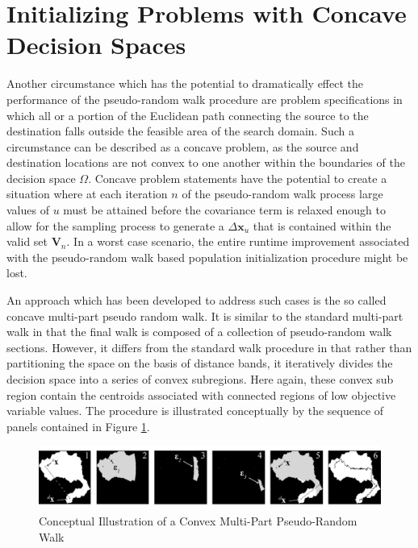 \section{Initializing Problems with Concave Decision Spaces}
            
Another circumstance which has the potential to dramatically effect the performance of the pseudo-random walk procedure are problem specifications in which all or a portion of the Euclidean path connecting the source to the destination falls outside the feasible area of the search domain. Such a circumstance can be described as a concave problem, as the source and destination locations are not convex to one another within the boundaries of the decision space $\Omega$. Concave problem statements have the potential to create a situation where at each iteration $n$ of the pseudo-random walk process large values of $u$ must be attained before the covariance term is relaxed enough to allow for the sampling process to generate a $\Delta\textbf{x}_u$ that is contained within the valid set $\textbf{V}_n$. In a worst case scenario, the entire runtime improvement associated with the pseudo-random walk based population initialization procedure might be lost.

An approach which has been developed to address such cases is the so called concave multi-part pseudo random walk. It is similar to the standard multi-part walk in that the final walk is composed of a collection of pseudo-random walk sections. However, it differs from the standard walk procedure in that rather than partitioning the space on the basis of distance bands, it iteratively divides the decision space into a series of convex subregions. Here again, these convex sub region contain the centroids associated with connected regions of low objective variable values. The procedure is illustrated conceptually by the sequence of panels contained in Figure \ref{fig:convex-multi-part-pseudo-random-walk-example}.
            
            \begin{figure}[!h]
            \centering
            \includegraphics[width=5.5in]{figures/convex-multi-part-pseudo-random-walk-example.png}
            \caption[Conceptual Illustration of a Convex Multi-Part Pseudo-Random Walk]{Conceptual Illustration of a Convex Multi-Part Pseudo-Random Walk}
            \label{fig:convex-multi-part-pseudo-random-walk-example}
            \end{figure}
            
